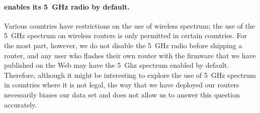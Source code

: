 \paragraph{\name{} enables its 5~GHz radio by default.} Various countries have
restrictions on the use of wireless spectrum; the use of the 5~GHz spectrum on
wireless routers is only permitted in certain countries.  For the most part,
however, we do not disable the 5~GHz radio before shipping a \name{} router, and
any user who flashes their own router with the firmware that we have published
on the Web may have the 5~Ghz spectrum enabled by default. Therefore, although
it might be interesting to explore the use of 5~GHz spectrum in countries where
it is not legal, the way that we have deployed our routers necessarily biases
our data set and does not allow us to answer this question accurately.


